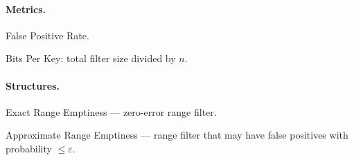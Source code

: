 \paragraph{Metrics.}
\begin{description}[style=nextline, leftmargin=4cm, labelwidth=3.4cm]
  \item[FPR] False Positive Rate.
  \item[BPK] Bits Per Key: total filter size divided by $n$.
\end{description}

\paragraph{Structures.}
\begin{description}[style=nextline, leftmargin=4cm, labelwidth=3.4cm]
  \item[ERE] Exact Range Emptiness --- zero-error range filter.
  \item[ARE] Approximate Range Emptiness --- range filter that may have false positives with probability $\leq \varepsilon$.
\end{description}
